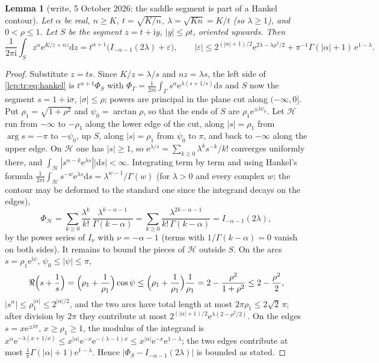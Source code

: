 \documentclass[11pt]{article}
\numberwithin{equation}{section}
\newtheorem{lemma}[theorem]{Lemma}
\theoremstyle{definition}\newtheorem{definition}[theorem]{Definition}
\theoremstyle{remark}\newtheorem{remark}[theorem]{Remark}
\newcommand{\ee}{\mathrm e}
\newcommand{\ii}{\mathrm i}%
\newcommand{\dd}{\mathrm d}%
\begin{document}
\begin{lemma}[write, 5 October 2026: the saddle segment is part of a Hankel contour]\label{lcp:tr:lem:hankel}
Let $\alpha$ be real, $n\ge K$, $t=\sqrt{K/n}$, $\lambda=\sqrt{Kn}=K/t$
(so $\lambda\ge1$), and $0<\rho\le1$. Let $S$ be the segment $z=t+\ii y$,
$|y|\le\rho t$, oriented upwards. Then
\begin{equation}\label{lcp:tr:eq:hankel}
 \frac1{2\pi\ii}\int_Sz^\alpha\ee^{K/z+nz}\dd z
 =t^{\alpha+1}\bigl(I_{-\alpha-1}(2\lambda)+\varepsilon\bigr),\qquad
 |\varepsilon|\le2^{(|\alpha|+1)/2}\ee^{2\lambda-\lambda\rho^2/2}
 +\pi^{-1}\Gamma(|\alpha|+1)\,\ee^{1-\lambda}.
\end{equation}
\end{lemma}
\begin{proof}
Substitute $z=ts$. Since $K/z=\lambda/s$ and $nz=\lambda s$, the left side
of \eqref{lcp:tr:eq:hankel} is $t^{\alpha+1}\Phi_S$ with
$\Phi_\Gamma=\frac1{2\pi\ii}\int_\Gamma s^\alpha\ee^{\lambda(s+1/s)}\dd s$ and
$S$ now the segment $s=1+\ii\sigma$, $|\sigma|\le\rho$; powers are principal
in the plane cut along $(-\infty,0]$. Put $\rho_1=\sqrt{1+\rho^2}$ and
$\psi_0=\arctan\rho$, so that the ends of $S$ are $\rho_1\ee^{\pm\ii\psi_0}$.
Let $\mathcal H$ run from $-\infty$ to $-\rho_1$ along the lower edge of the
cut, along $|s|=\rho_1$ from $\arg s=-\pi$ to $-\psi_0$, up $S$, along
$|s|=\rho_1$ from $\psi_0$ to $\pi$, and back to $-\infty$ along the upper
edge. On $\mathcal H$ one has $|s|\ge1$, so
$\ee^{\lambda/s}=\sum_{k\ge0}\lambda^ks^{-k}/k!$ converges uniformly there,
and $\int_{\mathcal H}|s^{\alpha-k}\ee^{\lambda s}||\dd s|<\infty$. Integrating
term by term and using Hankel's formula
$\frac1{2\pi\ii}\int_{\mathcal H}s^{-w}\ee^{\lambda s}\dd s=\lambda^{w-1}/\Gamma(w)$
(for $\lambda>0$ and every complex $w$; the contour may be deformed to the
standard one since the integrand decays on the edges),
\[
 \Phi_{\mathcal H}=\sum_{k\ge0}\frac{\lambda^k}{k!}\,
 \frac{\lambda^{k-\alpha-1}}{\Gamma(k-\alpha)}
 =\sum_{k\ge0}\frac{\lambda^{2k-\alpha-1}}{k!\,\Gamma(k-\alpha)}
 =I_{-\alpha-1}(2\lambda),
\]
by the power series of $I_\nu$ with $\nu=-\alpha-1$ (terms with
$1/\Gamma(k-\alpha)=0$ vanish on both sides). It remains to bound the
pieces of $\mathcal H$ outside $S$. On the arcs $s=\rho_1\ee^{\ii\psi}$,
$\psi_0\le|\psi|\le\pi$,
\[
 \Re\Bigl(s+\frac1s\Bigr)=\Bigl(\rho_1+\frac1{\rho_1}\Bigr)\cos\psi
 \le\Bigl(\rho_1+\frac1{\rho_1}\Bigr)\frac1{\rho_1}
 =2-\frac{\rho^2}{1+\rho^2}\le2-\frac{\rho^2}2,
\]
$|s^\alpha|\le\rho_1^{|\alpha|}\le2^{|\alpha|/2}$, and the two arcs have total
length at most $2\pi\rho_1\le2\sqrt2\,\pi$; after division by $2\pi$ they
contribute at most $2^{(|\alpha|+1)/2}\ee^{\lambda(2-\rho^2/2)}$. On the
edges $s=x\ee^{\pm\ii\pi}$, $x\ge\rho_1\ge1$, the modulus of the integrand is
$x^\alpha\ee^{-\lambda(x+1/x)}\le x^{|\alpha|}\ee^{-x}\ee^{-(\lambda-1)x}
\le x^{|\alpha|}\ee^{-x}\ee^{1-\lambda}$; the two edges contribute at most
$\frac1\pi\Gamma(|\alpha|+1)\ee^{1-\lambda}$. Hence
$|\Phi_S-I_{-\alpha-1}(2\lambda)|$ is bounded as stated.
\end{proof}
\end{document}
